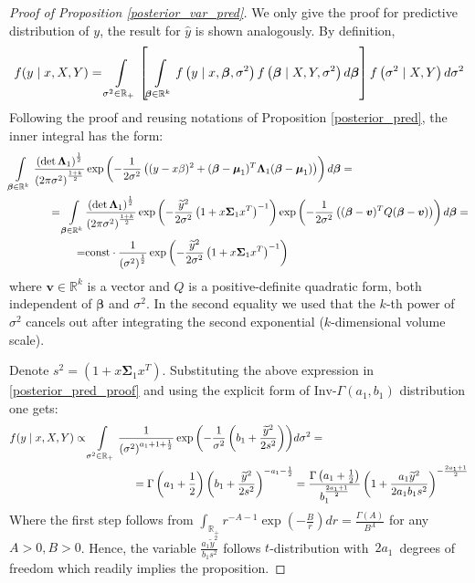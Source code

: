\documentclass[10pt,fleqn]{amsart}
\theoremstyle{definition}
\theoremstyle{remark}
\numberwithin{equation}{section}
\newcommand{\RR}{\mathbb{R}}
\newcommand{\const}{\text{const}}
\newcommand{\bbeta}{\boldsymbol{\beta}}
\newcommand{\mmu}{\boldsymbol{\mu}}
\newcommand{\SSigma}{\boldsymbol{\Sigma}}
\newcommand{\LLambda}{\boldsymbol{\Lambda}}
\newcommand{\ytilde}{\widetilde{y}}
\newcommand{\invGamma}{\text{Inv-}\Gamma}
\begin{document}
\begin{proof}[Proof of Proposition \ref{posterior_var_pred}]
We only give the proof for predictive distribution of $y$, the result for $\widehat{y}$ is shown analogously. By definition,
\begin{equation}\label{posterior_pred_proof}\begin{split}
    f(y\mid x, X, Y)=\int\displaylimits_{\sigma^2\in\RR_+}
    \left[\int\displaylimits_{\bbeta\in\RR^k}f\left(y\mid x,\bbeta,\sigma^2\right)f\left(\bbeta\mid X,Y,\sigma^2\right)d\bbeta\right]
    f\left(\sigma^2\mid X, Y\right)d\sigma^2
\end{split}\end{equation}
Following the proof and reusing notations of Proposition \ref{posterior_pred}, the inner integral has the form:
\begin{equation*}\begin{split}
    \int\displaylimits_{\bbeta\in\RR^k}\frac{\left(\det\LLambda_1\right)^{\frac 12}}{\left(2\pi\sigma^2\right)^{\frac{1+k}2}}
    &\exp\left(-\frac 1{2\sigma^2}\left((y-x\beta)^2+(\bbeta-\mmu_1)^T\LLambda_1(\bbeta-\mmu_1)\right)\right)d\bbeta=\\
    =\int\displaylimits_{\bbeta\in\RR^k}&\frac{\left(\det\LLambda_1\right)^{\frac 12}}{\left(2\pi\sigma^2\right)^{\frac{1+k}2}}
    \exp\left(-\frac{\ytilde^2}{2\sigma^2}\left(1+x\SSigma_1 x^T\right)^{-1}\right)
    \exp\left(-\frac 1{2\sigma^2}\left((\bbeta-\boldsymbol{v})^TQ(\bbeta-\boldsymbol{v})\right)\right)d\bbeta=\\
    =&\const\cdot\frac 1{\left(\sigma^2\right)^\frac 1 2}\exp\left(-\frac{\ytilde^2}{2\sigma^2}\left(1+x\SSigma_1 x^T\right)^{-1}\right)
\end{split}\end{equation*}
where $\boldsymbol{v}\in\RR^k$ is a vector and $Q$ is a positive-definite quadratic form, both independent of $\bbeta$ and $\sigma^2$.
In the second equality we used that the $k$-th power of $\sigma^2$ cancels out after integrating the second exponential
($k$-dimensional volume scale).

Denote $s^2=\left(1+x\SSigma_1 x^T\right)$. Substituting the above expression in \ref{posterior_pred_proof} and using the explicit form
of $\invGamma(a_1, b_1)$ distribution one gets:
\begin{equation*}\begin{split}
    f(y\mid x, X, Y)\propto\int\displaylimits_{\sigma^2\in\RR_+}\frac 1{\left(\sigma^2\right)^{a_1+1+\frac 1 2}}
    \exp\left(-\frac 1{\sigma^2}\left(b_1+\frac{\ytilde^2}{2s^2}\right)\right)&d\sigma^2=\\
    =\Gamma\left(a_1+\frac 1 2\right)\left(b_1+\frac{\ytilde^2}{2s^2}\right)^{-a_1-\frac 1 2}&=
    \frac{\Gamma\left(a_1+\frac 1 2\right)}{b_1^{\frac{2a_1+1}2}}\left(1+\frac{a_1 \ytilde^2 }{2a_1 b_1 s^2}\right)^{-\frac{2a_1+1}2}
\end{split}\end{equation*}
Where the first step follows from $\displaystyle\int_{\RR_+}r^{-A-1}\exp\left(-\frac B r\right) dr=\frac{\Gamma(A)}{B^A}$ for any $A>0, B>0$.
Hence, the variable $\displaystyle\frac{a_1 \ytilde^2 }{b_1 s^2}$ follows $t$-distribution with~$2a_1$~degrees of freedom
which readily implies the proposition.
\end{proof}
\end{document}
